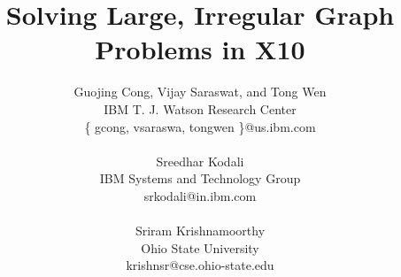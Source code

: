 \documentclass[10pt]{article}
\numberwithin{equation}{section}
\def\Xten{{\sf X10}}
\begin{document}
\title{Solving Large, Irregular Graph Problems in \Xten}

\author{
Guojing Cong,  Vijay Saraswat, and Tong Wen\\
IBM T. J. Watson Research Center\\
 \{ gcong, vsaraswa, tongwen \}@us.ibm.com\\ 
\vspace*{-2ex} \\
Sreedhar Kodali\\
IBM Systems and Technology Group\\
srkodali@in.ibm.com\\
\vspace*{-2ex} \\
Sriram Krishnamoorthy \\
Ohio State University\\
krishnsr@cse.ohio-state.edu
\vspace*{-3ex} \\
}

\date{}

\maketitle
\thispagestyle{empty}
\end{document}
